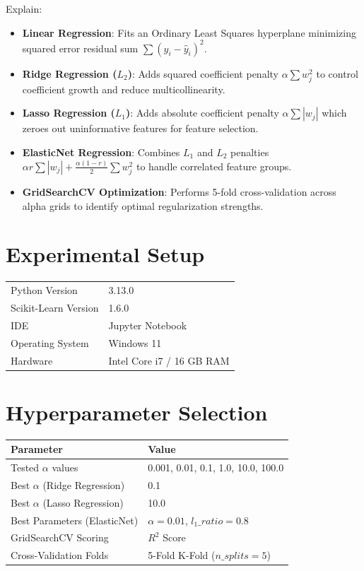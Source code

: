 \documentclass[12pt,a4paper]{article}
\begin{document}
Explain:
\begin{itemize}
\item \textbf{Linear Regression}: Fits an Ordinary Least Squares hyperplane minimizing squared error residual sum $\sum (y_i - \hat{y}_i)^2$.
\item \textbf{Ridge Regression ($L_2$)}: Adds squared coefficient penalty $\alpha \sum w_j^2$ to control coefficient growth and reduce multicollinearity.
\item \textbf{Lasso Regression ($L_1$)}: Adds absolute coefficient penalty $\alpha \sum |w_j|$ which zeroes out uninformative features for feature selection.
\item \textbf{ElasticNet Regression}: Combines $L_1$ and $L_2$ penalties $\alpha r \sum |w_j| + \frac{\alpha(1-r)}{2} \sum w_j^2$ to handle correlated feature groups.
\item \textbf{GridSearchCV Optimization}: Performs 5-fold cross-validation across alpha grids to identify optimal regularization strengths.
\end{itemize}

\section{Experimental Setup}

\begin{tabular}{ll}
\toprule
Python Version & 3.13.0 \\
Scikit-Learn Version & 1.6.0 \\
IDE & Jupyter Notebook \\
Operating System & Windows 11 \\
Hardware & Intel Core i7 / 16 GB RAM \\
\bottomrule
\end{tabular}

\section{Hyperparameter Selection}

\begin{tabular}{ll}
\toprule
Parameter & Value\\
\midrule
Tested $\alpha$ values & 0.001, 0.01, 0.1, 1.0, 10.0, 100.0 \\
Best $\alpha$ (Ridge Regression) & 0.1 \\
Best $\alpha$ (Lasso Regression) & 10.0 \\
Best Parameters (ElasticNet) & $\alpha = 0.01$, $l_1\_ratio = 0.8$ \\
GridSearchCV Scoring & $R^2$ Score \\
Cross-Validation Folds & 5-Fold K-Fold ($n\_splits = 5$) \\
\bottomrule
\end{tabular}
\end{document}
